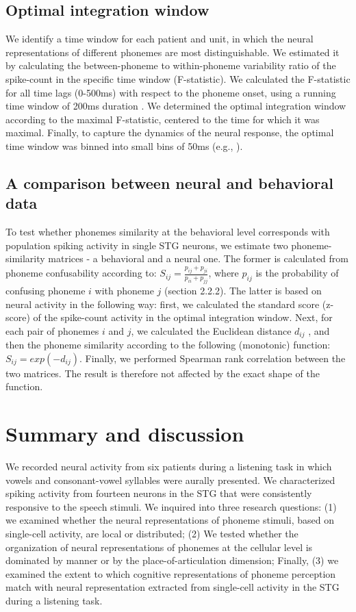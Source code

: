 \subsection{Optimal integration window}
We identify a time window for each patient and unit, in which the neural representations of different phonemes are most distinguishable. We estimated it by calculating the between-phoneme to within-phoneme variability ratio of the spike-count in the specific time window (F-statistic). We calculated the F-statistic for all time lags (0-500ms) with respect to the phoneme onset, using a running time window of 200ms duration \citep{chan2013speech}. We determined the optimal integration window according to the maximal F-statistic, centered to the time for which it was maximal. Finally, to capture the dynamics of the neural response, the optimal time window was binned into small bins of 50ms (e.g., \citealp{Mesgarani2014}). 

\subsection{A comparison between neural and behavioral data}
To test whether phonemes similarity at the behavioral level corresponds with population spiking activity in single STG neurons, we estimate two phoneme-similarity matrices - a behavioral and a neural one. The former is calculated from phoneme confusability according to: $S_{ij}=\frac{p_{ij}+p_{ji}}{p_{ii}+p_{jj}}$, where $p_{ij}$ is the probability of confusing phoneme $i$ with phoneme $j$ (section 2.2.2). The latter is based on neural activity in the following way: first, we calculated the standard score (z-score) of the spike-count activity in the optimal integration window. Next, for each pair of phonemes $i$ and $j$, we calculated the Euclidean distance $d_{ij}$ \citep{khalighinejad2017dynamic}, and then the phoneme similarity according to the following (monotonic) function: $S_{ij}=exp(-d_{ij})$. Finally, we performed Spearman rank correlation between the two matrices. The result is therefore not affected by the exact shape of the function. 

\section{Summary and discussion}
We recorded neural activity from six patients during a listening task in which vowels and consonant-vowel syllables were aurally presented. We characterized spiking activity from fourteen neurons in the STG that were consistently responsive to the speech stimuli. We inquired into three research questions: (1) we examined whether the neural representations of phoneme stimuli, based on single-cell activity, are local or distributed; (2) We tested whether the organization of neural representations of phonemes at the cellular level is dominated by manner or by the place-of-articulation dimension; Finally, (3) we examined the extent to which cognitive representations of phoneme perception match with neural representation extracted from single-cell activity in the STG during a listening task.

